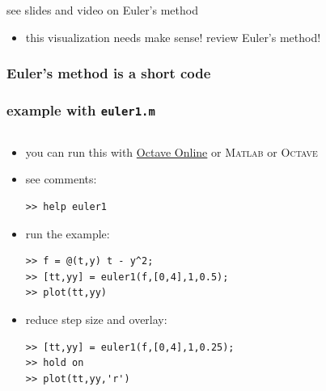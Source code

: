 \documentclass[urlcolor=blue,dvipsnames]{beamer}
\newcommand{\Matlab}{\textsc{Matlab}\xspace}
\newcommand{\Octave}{\textsc{Octave}\xspace}
\begin{document}
\begin{frame}{see slides and video on Euler's method}
\begin{itemize}
    \begin{itemize}
    \item this visualization needs make sense! review Euler's method!
    \end{itemize}
\end{itemize}
\end{frame}


\begin{frame}[fragile]
\frametitle{Euler's method is a short code}

\bigskip
{}
\end{frame}


\begin{frame}[fragile]
\frametitle{example with \texttt{euler1.m}}

\begin{columns}
\begin{column}{0.55\textwidth}
\begin{itemize}
\item you can run this with \href{https://octave-online.net/}{Octave Online} or \Matlab or \Octave
\item see comments:
\begin{Verbatim}[fontsize=\footnotesize]
>> help euler1
\end{Verbatim}
\item run the example:
\begin{Verbatim}[fontsize=\footnotesize]
>> f = @(t,y) t - y^2;
>> [tt,yy] = euler1(f,[0,4],1,0.5);
>> plot(tt,yy)
\end{Verbatim}
\item reduce step size and overlay:
\begin{Verbatim}[fontsize=\footnotesize]
>> [tt,yy] = euler1(f,[0,4],1,0.25);
>> hold on
>> plot(tt,yy,'r')
\end{Verbatim}
\end{itemize}
\end{column}
\begin{column}{0.45\textwidth}


\end{column}
\end{columns}
\end{frame}
\end{document}
